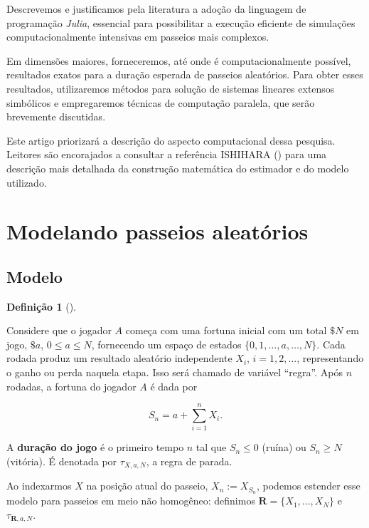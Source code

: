 \documentclass[
  brazilian,
  12pt,
]{article}
\theoremstyle{definition}
\theoremstyle{definition}
\newtheorem{definition}{Definição}[section]
\theoremstyle{remark}
\begin{document}
Descrevemos e justificamos pela literatura a adoção da linguagem de
programação \emph{Julia}, essencial para possibilitar a execução
eficiente de simulações computacionalmente intensivas em passeios mais
complexos.

Em dimensões maiores, forneceremos, até onde é computacionalmente
possível, resultados exatos para a duração esperada de passeios
aleatórios. Para obter esses resultados, utilizaremos métodos para
solução de sistemas lineares extensos simbólicos e empregaremos técnicas
de computação paralela, que serão brevemente discutidas.

Este artigo priorizará a descrição do aspecto computacional dessa
pesquisa. Leitores são encorajados a consultar a referência ISHIHARA
() para uma descrição mais
detalhada da construção matemática do estimador e do modelo utilizado.

\section{Modelando passeios
aleatórios}\label{modelando-passeios-aleatuxf3rios}

\subsection{Modelo}\label{modelo}

\begin{definition}[]\protect\hypertarget{def-modelodiscreto}{}\label{def-modelodiscreto}

Considere que o jogador \(A\) começa com uma fortuna inicial com um
total \(\$N\) em jogo, \(\$a\), \(0 \leq a \leq N\), fornecendo um
espaço de estados \(\{0, 1, \dots, a, \dots, N\}\). Cada rodada produz
um resultado aleatório independente \(X_i\), \(i=1,2,\dots\),
representando o ganho ou perda naquela etapa. Isso será chamado de
variável ``regra''. Após \(n\) rodadas, a fortuna do jogador \(A\) é
dada por

\[
S_n = a + \sum_{i=1}^n X_i.
\]

A \textbf{duração do jogo} é o primeiro tempo \(n\) tal que
\(S_n \leq 0\) (ruína) ou \(S_n \geq N\) (vitória). É denotada por
\(\tau_{X, a, N}\), a regra de parada.

Ao indexarmos \(X\) na posição atual do passeio, \(X_{n} := X_{S_n}\),
podemos estender esse modelo para passeios em meio não homogêneo:
definimos \(\pmb{R} =
\{X_1, \dots, X_N\}\) e \(\tau_{\pmb{R}, a, N}\).

\end{definition}
\end{document}
